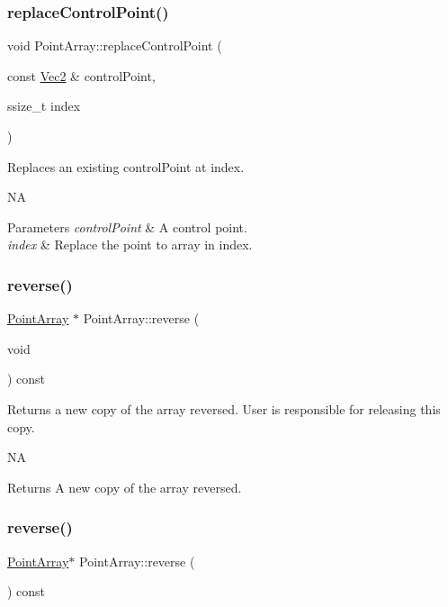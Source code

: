 \subsubsection{\texorpdfstring{replace\+Control\+Point()}{replaceControlPoint()}\hspace{0.1cm}{\footnotesize\ttfamily [2/2]}}
{\footnotesize\ttfamily void Point\+Array\+::replace\+Control\+Point (\begin{DoxyParamCaption}\item[{const \hyperlink{classVec2}{Vec2} \&}]{control\+Point,  }\item[{ssize\+\_\+t}]{index }\end{DoxyParamCaption})}

Replaces an existing control\+Point at index.

NA 
\begin{DoxyParams}{Parameters}
{\em control\+Point} & A control point. \\
\hline
{\em index} & Replace the point to array in index. \\
\hline
\end{DoxyParams}
\mbox{\label{classPointArray_aff4902e67a82db5e0258b4a8d9587235}} 
\subsubsection{\texorpdfstring{reverse()}{reverse()}\hspace{0.1cm}{\footnotesize\ttfamily [1/2]}}
{\footnotesize\ttfamily \hyperlink{classPointArray}{Point\+Array} $\ast$ Point\+Array\+::reverse (\begin{DoxyParamCaption}\item[{void}]{ }\end{DoxyParamCaption}) const}

Returns a new copy of the array reversed. User is responsible for releasing this copy.

NA \begin{DoxyReturn}{Returns}
A new copy of the array reversed. 
\end{DoxyReturn}
\mbox{\label{classPointArray_a30dd1637cc22606b4151ae6c56783609}} 
\subsubsection{\texorpdfstring{reverse()}{reverse()}\hspace{0.1cm}{\footnotesize\ttfamily [2/2]}}
{\footnotesize\ttfamily \hyperlink{classPointArray}{Point\+Array}$\ast$ Point\+Array\+::reverse (\begin{DoxyParamCaption}{ }\end{DoxyParamCaption}) const}

